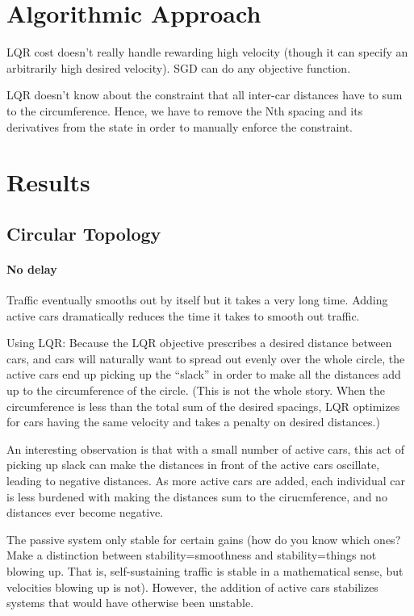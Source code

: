 \documentclass[10pt,twocolumn]{article}
\begin{document}
\section{Algorithmic Approach}

LQR cost doesn't really handle rewarding high velocity (though it can specify an arbitrarily high desired velocity). SGD can do any objective function.

LQR doesn't know about the constraint that all inter-car distances have to sum to the circumference. Hence, we have to remove the Nth spacing and its derivatives from the state in order to manually enforce the constraint.

\section{Results}

\subsection{Circular Topology}

\paragraph{No delay} Traffic eventually smooths out by itself but it takes a very long time. Adding active cars dramatically reduces the time it takes to smooth out traffic. 

Using LQR: Because the LQR objective prescribes a desired distance between cars, and cars will naturally want to spread out evenly over the whole circle, the active cars end up picking up the ``slack'' in order to make all the distances add up to the circumference of the circle. (This is not the whole story. When the circumference is less than the total sum of the desired spacings, LQR optimizes for cars having the same velocity and takes a penalty on desired distances.)

An interesting observation is that with a small number of active cars, this act of picking up slack can make the distances in front of the active cars oscillate, leading to negative distances. As more active cars are added, each individual car is less burdened with making the distances sum to the cirucmference, and no distances ever become negative.

The passive system only stable for certain gains (how do you know which ones? Make a distinction between stability=smoothness and stability=things not blowing up. That is, self-sustaining traffic is stable in a mathematical sense, but velocities blowing up is not). However, the addition of active cars stabilizes systems that would have otherwise been unstable.
\end{document}

